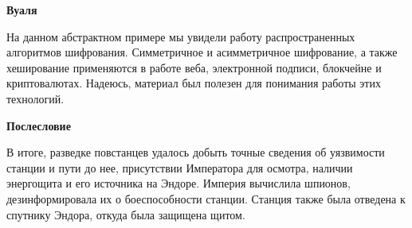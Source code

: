 \documentclass[12pt]{article}
\begin{document}
\begin{enumerate}
			\textbf{Вуаля}
			\vspace{1cm}
			
			На данном абстрактном примере мы увидели работу распространенных алгоритмов шифрования. Симметричное и асимметричное шифрование, а также хеширование применяются в работе веба, электронной подписи, блокчейне и криптовалютах. Надеюсь, материал был полезен для понимания работы этих технологий.
			
			\vspace{1cm}
			\textbf{Послесловие}
			\vspace{0.5cm}
			
			В итоге, разведке повстанцев удалось добыть точные сведения об уязвимости станции и пути до нее, присутствии Императора для осмотра, наличии энергощита и его источника на Эндоре. Империя вычислила шпионов, дезинформировала их о боеспособности станции. Станция также была отведена к спутнику Эндора, откуда была защищена щитом.
			
	\end{enumerate}
    
\end{document}
